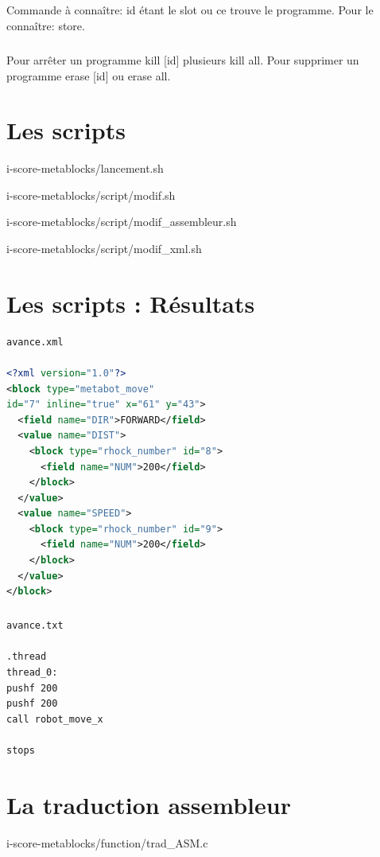 \documentclass[10pt,a4paper]{report}
\begin{document}
\begin{appendices}
\paragraph{}
Commande à connaître:
id étant le slot ou ce trouve le programme. Pour le connaître: store.
\paragraph{}
Pour arrêter un programme kill [id] plusieurs kill all. Pour supprimer un programme erase [id] ou erase all.

\chapter{Les scripts} 

{i-score-metablocks/lancement.sh}
\newpage

{i-score-metablocks/script/modif.sh}


{i-score-metablocks/script/modif_assembleur.sh}


{i-score-metablocks/script/modif_xml.sh}

\chapter{Les scripts : Résultats} 
\begin{lstlisting}[language=xml, frame=none]
avance.xml

<?xml version="1.0"?>
<block type="metabot_move" 
id="7" inline="true" x="61" y="43">
  <field name="DIR">FORWARD</field>
  <value name="DIST">
    <block type="rhock_number" id="8">
      <field name="NUM">200</field>
    </block>
  </value>
  <value name="SPEED">
    <block type="rhock_number" id="9">
      <field name="NUM">200</field>
    </block>
  </value>
</block>
\end{lstlisting}
\paragraph{}

\begin{verbatim}
avance.txt

.thread
thread_0:
pushf 200
pushf 200
call robot_move_x

stops 
\end{verbatim}
\chapter{La traduction assembleur} 

{i-score-metablocks/function/trad_ASM.c}


\end{appendices}
\end{document}
